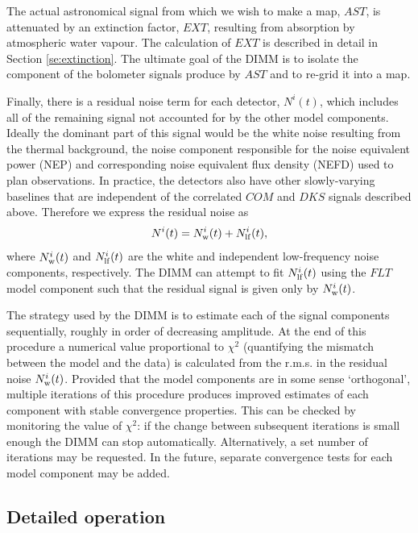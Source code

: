 \documentclass[twoside,11pt]{article}
\renewcommand{\_}{\texttt{\symbol{95}}}
\begin{document}
The actual astronomical signal from which we wish to make a map,
$AST$, is attenuated by an extinction factor, $EXT$, resulting from
absorption by atmospheric water vapour. The calculation of $EXT$ is
described in detail in Section \ref{se:extinction}. The ultimate goal
of the DIMM is to isolate the component of the bolometer signals
produce by $AST$ and to re-grid it into a map.

Finally, there is a residual noise term for each detector, $N^i(t)$,
which includes all of the remaining signal not accounted for by the
other model components. Ideally the dominant part of this signal would
be the white noise resulting from the thermal background, the noise
component responsible for the noise equivalent power (NEP) and
corresponding noise equivalent flux density (NEFD) used to plan
observations. In practice, the detectors also have other
slowly-varying baselines that are independent of the correlated $COM$
and $DKS$ signals described above. Therefore we express the residual
noise as
%
\begin{equation}
N^i(t) = N^i_{\rm w}(t) + N^i_{\rm lf}(t),
\label{eq:dimm_noise}
\end{equation}
%
where $N^i_{\rm w}(t)$ and $N^i_{\rm lf}(t)$ are the white and
independent low-frequency noise components, respectively. The DIMM can
attempt to fit $N^i_{\rm lf}(t)$ using the $FLT$ model component such
that the residual signal is given only by $N^i_{\rm w}(t)$.

The strategy used by the DIMM is to estimate each of the signal
components sequentially, roughly in order of decreasing amplitude. At
the end of this procedure a numerical value proportional to $\chi^2$
(quantifying the mismatch between the model and the data) is
calculated from the r.m.s. in the residual noise $N^i_{\rm
  w}(t)$. Provided that the model components are in some sense
`orthogonal', multiple iterations of this procedure produces improved
estimates of each component with stable convergence properties. This
can be checked by monitoring the value of $\chi^2$: if the change
between subsequent iterations is small enough the DIMM can stop
automatically. Alternatively, a set number of iterations may be
requested. In the future, separate convergence tests for each model
component may be added.

\subsection{Detailed operation\label{se:dimmdetails}}
\end{document}
